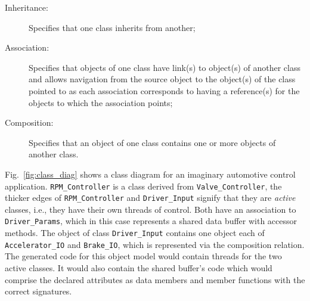 \begin{description}
\item[Inheritance:]{Specifies that one class inherits from another;}
\item[Association:]{Specifies that objects of one class have link(s)
  to object(s) of another class and allows navigation from the source
  object to the object(s) of the class pointed to as each association
  corresponds to having a reference(s) for the objects to which the
  association points;}
\item[Composition:]{Specifies that an object of one class contains one
  or more objects of another class.}
\end{description}

Fig.~\ref{fig:class_diag} shows a class diagram for an imaginary
automotive control application. \texttt{RPM\_Controller} is a class
derived from \texttt{Valve\_Controller}, the thicker edges of
\texttt{RPM\_Controller} and \texttt{Driver\_Input} signify that they
are \emph{active} classes, i.e., they have their own threads of
control. Both have an association to \texttt{Driver\_Params}, which in
this case represents a shared data buffer with accessor methods. The
object of class \texttt{Driver\_Input} contains one object each of
\texttt{Accelerator\_IO} and \texttt{Brake\_IO}, which is represented
via the composition relation. The generated code for this object model
would contain threads for the two active classes. It would also
contain the shared buffer's code which would comprise the declared
attributes as data members and member functions with the correct
signatures.

